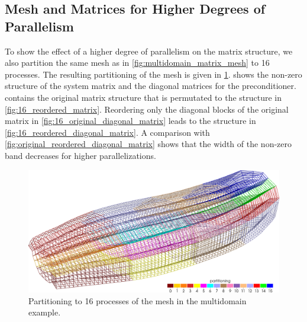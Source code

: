 \subsection{Mesh and Matrices for Higher Degrees of Parallelism}
To show the effect of a higher degree of parallelism on the matrix structure, we also partition the same mesh as in \cref{fig:multidomain_matrix_mesh} to 16 processes. The resulting partitioning of the mesh is given in \cref{fig:16_multidomain_matrix_mesh}.
 shows the non-zero structure of the system matrix and the diagonal matrices for the preconditioner.  contains the original matrix structure that is permutated to the structure in \cref{fig:16_reordered_matrix}. Reordering only the diagonal blocks of the original matrix in \cref{fig:16_original_diagonal_matrix} leads to the structure in \cref{fig:16_reordered_diagonal_matrix}. 
A comparison with \cref{fig:original_reordered_diagonal_matrix} shows that the width of the non-zero band decreases for higher parallelizations.


\begin{figure}
  \centering%
  \includegraphics[width=\textwidth]{images/implementation/16_multidomain_matrix_mesh.png}%
  \caption{Partitioning to 16 processes of the mesh in the multidomain example.}%
  \label{fig:16_multidomain_matrix_mesh}%
\end{figure}%

